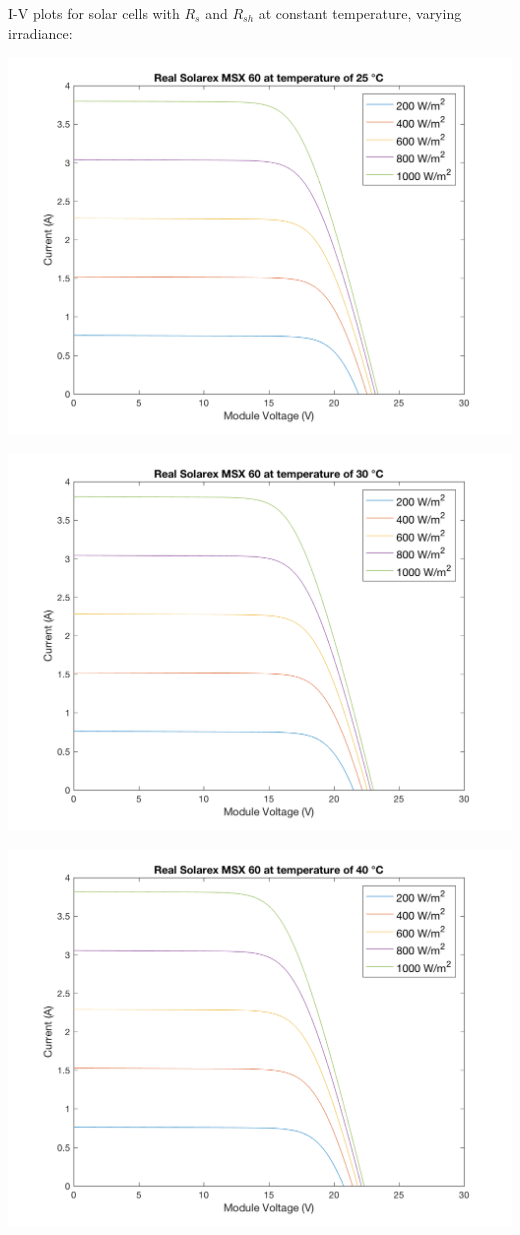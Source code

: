 \documentclass[fleqn]{article}
\begin{document}
\begin{enumerate}
  \pagebreak
  I-V plots for solar cells with $R_s$ and $R_{sh}$ at constant temperature, varying irradiance:
  \begin{center}
    \includegraphics[width=0.9\linewidth]{25C-r.png}
  \end{center}
  \begin{center}
    \includegraphics[width=0.9\linewidth]{30C-r.png}
  \end{center}
  \begin{center}
    \includegraphics[width=0.9\linewidth]{40C-r.png}

\end{center}
\end{enumerate}
\end{document}
